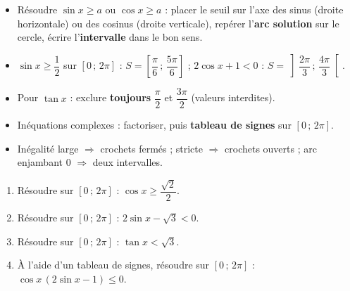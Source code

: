 \documentclass[11pt]{article}
\begin{document}
\begin{aretenir}
\begin{itemize}
\item Résoudre $\sin x \geq a$ ou $\cos x \geq a$ : placer le seuil sur l'axe des sinus (droite horizontale) ou des cosinus (droite verticale), repérer l'\textbf{arc solution} sur le cercle, écrire l'\textbf{intervalle} dans le bon sens.
\item $\sin x \geq \dfrac{1}{2}$ sur $[0\,;\,2\pi]$ : $S = \left[\dfrac{\pi}{6}\,;\,\dfrac{5\pi}{6}\right]$ ; \quad $2\cos x + 1 < 0$ : $S = \left]\dfrac{2\pi}{3}\,;\,\dfrac{4\pi}{3}\right[$.
\item Pour $\tan x$ : exclure \textbf{toujours} $\dfrac{\pi}{2}$ et $\dfrac{3\pi}{2}$ (valeurs interdites).
\item Inéquations complexes : factoriser, puis \textbf{tableau de signes} sur $[0\,;\,2\pi]$.
\item Inégalité large $\Rightarrow$ crochets fermés ; stricte $\Rightarrow$ crochets ouverts ; arc enjambant $0$ $\Rightarrow$ deux intervalles.
\end{itemize}
\end{aretenir}

\begin{exercice}
\begin{enumerate}
\item Résoudre sur $[0\,;\,2\pi]$ : $\cos x \geq \dfrac{\sqrt{2}}{2}$.
\item Résoudre sur $[0\,;\,2\pi]$ : $2\sin x - \sqrt{3} < 0$.
\item Résoudre sur $[0\,;\,2\pi]$ : $\tan x < \sqrt{3}$.
\item À l'aide d'un tableau de signes, résoudre sur $[0\,;\,2\pi]$ : $\cos x\,(2\sin x - 1) \leq 0$.
\end{enumerate}
\end{exercice}
\end{document}
